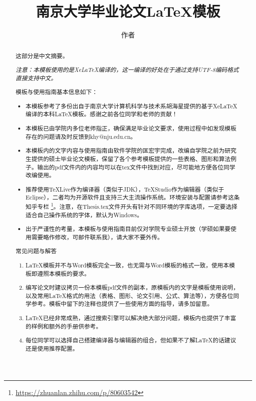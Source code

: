\documentclass[winfonts,master,twoside,AutoFakeBold= {2}]{njuthesis}
\title{南京大学毕业论文\LaTeX 模板}
\author{作者}
\institute{南京大学}
\begin{document}

\maketitle
\makeenglishtitle


\frontmatter

\begin{abstract}
	这部分是中文摘要。
	
	\textit{注意：本模板使用的是XeLaTeX编译的，这一编译的好处在于通过支持UTF-8编码格式直接支持中文。}
	
	模板与使用指南基本信息如下：
	\begin{itemize}
		\item 本模板参考了多份出自于南京大学计算机科学与技术系胡海星提供的基于XeLaTeX编译的本科LaTeX模板。感谢之前各位同学和老师的贡献！
		\item 本模板已由学院内多位老师指正，确保满足毕业论文要求，使用过程中如发现模板存在的问题请及时反馈到khy@nju.edu.cn。
		\item 本模板内的文字内容与使用指南由软件学院的匡宏宇完成，改编自学院之前为研究生提供的硕士毕业论文模板，保留了各个参考模板提供的一些表格、图形和算法例子。输出的pdf文件内的内容均可以在tex文件中找到对应，尽可能地方便各位同学改编使用。
		\item 推荐使用TeXLive作为编译器（类似于JDK），TeXStudio作为编辑器（类似于Eclipse），二者均为开源软件且支持三大主流操作系统。环境安装与配置请参考这条知乎专栏 \footnote{\url{https://zhuanlan.zhihu.com/p/80603542}}。注意，在Thesis.tex文件开头有针对不同环境的字库选项，一定要选择适合自己操作系统的字体，默认为Windows。
		\item  出于严谨性的考量，本模板与使用指南目前仅对学院专业硕士开放（学硕如果要使用需要略作修改，可邮件联系我），请大家不要外传。
	\end{itemize}
	
	常见问题与解答
	\begin{enumerate}
		\item LaTeX模板并不与Word模板完全一致，也无需与Word模板的格式一致，使用本模板即遵照本模板的要求。
		\item 编写论文时建议拷贝一份本模板pdf文件的副本，原模板内的文字是模板使用说明，以及常用LaTeX格式的用法（表格、图形、论文引用、公式、算法等），方便各位同学参考。模板中留下的注释也提供了一些使用方面的指导，请多加留意。
		\item LaTeX已经非常成熟，通过搜索引擎可以解决绝大部分问题，模板内也提供了丰富的样例和额外的手册供参考。
		\item 每位同学可以选择自己搭建编译器与编辑器的组合，但如果不了解LaTeX的话建议还是使用推荐配置。
	\end{enumerate}
\end{abstract}
\end{document}
